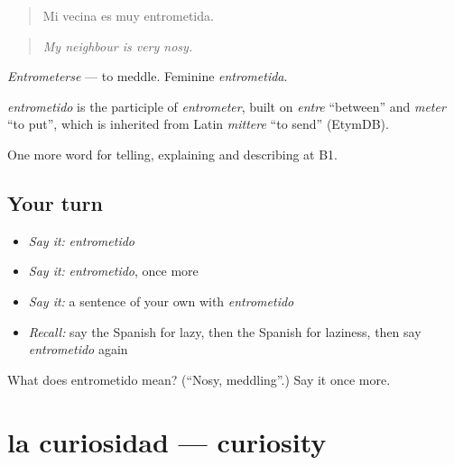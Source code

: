 \begin{quote}
Mi vecina es muy entrometida.
\end{quote}

\begin{quote}
\emph{My neighbour is very nosy.}
\end{quote}

\emph{Entrometerse} — to meddle. Feminine \emph{entrometida}.

\begin{cousinweb}
\emph{entrometido} is the participle of \emph{entrometer}, built on \emph{entre} \textquotedblleft{}between\textquotedblright{} and \emph{meter} \textquotedblleft{}to put\textquotedblright{}, which is inherited from Latin \emph{mittere} \textquotedblleft{}to send\textquotedblright{} (EtymDB).
\end{cousinweb}

\begin{grammarlens}[title={What you've built}]
One more word for telling, explaining and describing at B1.
\end{grammarlens}

\subsection*{Your turn}
\begin{itemize}
\raggedright
  \item \emph{Say it:} \emph{entrometido}
  \item \emph{Say it:} \emph{entrometido}, once more
  \item \emph{Say it:} a sentence of your own with \emph{entrometido}
  \item \emph{Recall:} say the Spanish for lazy, then the Spanish for laziness, then say \emph{entrometido} again
\end{itemize}

\begin{tcolorbox}[breakable,colback=teal!4,colframe=teal!35!black,title={Before you move on}]
What does entrometido mean? (\textquotedblleft{}Nosy, meddling\textquotedblright{}.) Say it once more.
\end{tcolorbox}
\section[la curiosidad]{la curiosidad — curiosity}

\label{lesson:ES-C729-curiosidad}



